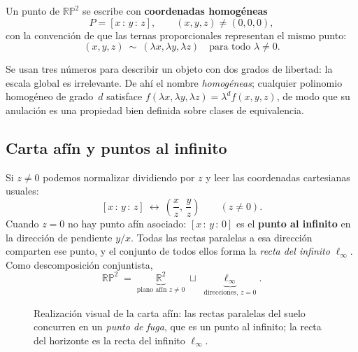 \documentclass[11pt,a4paper]{article}
\newcommand{\RP}{\mathbb{RP}}
\newcommand{\R}{\mathbb{R}}
\newcommand{\hp}[3]{[#1\,{:}\,#2\,{:}\,#3]}
\begin{document}
\begin{defbox}
Un punto de $\RP^2$ se escribe con \textbf{coordenadas homogéneas}
\[
  P = \hp{x}{y}{z}, \qquad (x,y,z)\neq(0,0,0),
\]
con la convención de que las ternas proporcionales representan el mismo
punto:
\[
  (x,y,z)\ \sim\ (\lambda x,\lambda y,\lambda z)
  \quad\text{para todo } \lambda\neq 0.
\]
\end{defbox}

\noindent Se usan tres números para describir un objeto con dos grados de
libertad: la escala global es irrelevante. De ahí el nombre
\emph{homogéneas}; cualquier polinomio homogéneo de grado~$d$ satisface
$f(\lambda x,\lambda y,\lambda z)=\lambda^d f(x,y,z)$, de modo que su
anulación es una propiedad bien definida sobre clases de equivalencia.

\subsection{Carta afín y puntos al infinito}
\label{sec:carta}

Si $z\neq0$ podemos normalizar dividiendo por $z$ y leer las coordenadas
cartesianas usuales:
\[
  \hp{x}{y}{z}\ \longleftrightarrow\ \left(\frac{x}{z},\,\frac{y}{z}\right)
  \qquad (z\neq 0).
\]
Cuando $z=0$ no hay punto afín asociado: $\hp{x}{y}{0}$ es el \textbf{punto
al infinito} en la dirección de pendiente $y/x$. Todas las rectas paralelas
a esa dirección comparten ese punto, y el conjunto de todos ellos forma la
\emph{recta del infinito} $\ell_\infty$. Como descomposición conjuntista,
\[
  \RP^2 \;=\; \underbrace{\R^2}_{\text{plano afín }z\neq0}
              \;\sqcup\;
              \underbrace{\ell_\infty}_{\text{direcciones, }z=0}.
\]

\begin{figure}[ht]
\centering
{}
\caption{Realización visual de la carta afín: las rectas paralelas del
suelo concurren en un \emph{punto de fuga}, que es un punto al infinito; la
recta del horizonte es la recta del infinito $\ell_\infty$.}
\label{fig:persp}
\end{figure}
\end{document}
